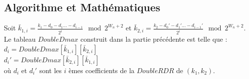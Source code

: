 \documentclass[12pt, a4paper]{memoir}
\begin{document}
  \subsection{Algorithme et Mathématiques}

  \begin{Proposition}
  Soit $\bar{k}_{1,i} = \frac{k_1-d_0-d_1 \ldots -d_{i-1}}{2^i} \mod 2^{W_n+2}$ et $\bar{k}_{2,i} = \frac{k_2-d_0'-d_1' \ldots -d_{i-1}'}{2^i} \mod 2^{W_n+2}$. \\
  
  Le tableau $DoubleDmax$ construit dans la partie précédente est telle que : \\
  $d_i = DoubleDmax[\bar{k}_{1,i}][\bar{k}_{2,i}]$ \\
  $d_i' = DoubleDmax[\bar{k}_{2,i}][\bar{k}_{1,i}]$ \\
  où $d_i$ et $d_i'$ sont les $i$ èmes coefficients de la $DoubleRDR$ de $(k_1,k_2)$.
  \end{Proposition}
\end{document}
